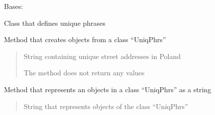 \documentclass[letterpaper,10pt,english]{sphinxmanual}
\begin{document}

\begin{fulllineitems}
\label{\detokenize{db_classes:db_classes.UniqPhrs}}
\pysigstartsignatures
{}
\pysigstopsignatures
\sphinxAtStartPar
Bases: 

\sphinxAtStartPar
Class that defines unique phrases

\begin{fulllineitems}
\label{\detokenize{db_classes:db_classes.UniqPhrs.__init__}}
\pysigstartsignatures
{}
\pysigstopsignatures
\sphinxAtStartPar
Method that creates objects from a class “UniqPhrs”
\begin{quote}\begin{description}
\sphinxAtStartPar
{} \textendash{} String containing unique street addresses in Poland

\sphinxAtStartPar
The method does not return any values

\end{description}\end{quote}

\end{fulllineitems}


\begin{fulllineitems}
\label{\detokenize{db_classes:db_classes.UniqPhrs.__repr__}}
\pysigstartsignatures
{}
\pysigstopsignatures
\sphinxAtStartPar
Method that represents an objects in a class “UniqPhrs” as a string
\begin{quote}\begin{description}
\sphinxAtStartPar
{}

\sphinxAtStartPar
String that represents objects of the class “UniqPhrs”

\end{description}\end{quote}

\end{fulllineitems}


\end{fulllineitems}
\end{document}
